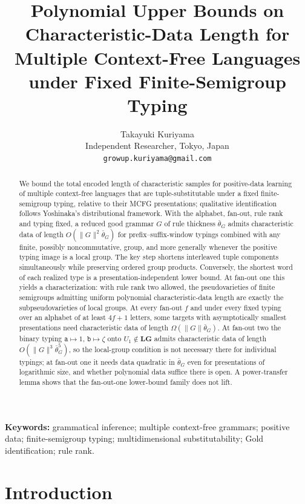 \documentclass[11pt]{article}
\title{Polynomial Upper Bounds on Characteristic-Data Length for Multiple Context-Free Languages under Fixed Finite-Semigroup Typing}
\author{Takayuki Kuriyama\\
Independent Researcher, Tokyo, Japan\\
\texttt{growup.kuriyama@gmail.com}}
\date{}
\numberwithin{equation}{section}
\theoremstyle{plain}
\theoremstyle{definition}
\theoremstyle{remark}
\begin{document}
\maketitle

\begin{abstract}
We bound the total encoded length of characteristic samples for
positive-data learning of multiple context-free languages that are
tuple-substitutable under a fixed finite-semigroup typing, relative to
their MCFG presentations; qualitative identification follows Yoshinaka's
distributional framework.  With the alphabet, fan-out, rule rank and
typing fixed, a reduced good grammar $G$ of rule thickness $\bar\theta_G$
admits characteristic data of length $O(\|G\|^2\bar\theta_G)$ for
prefix--suffix-window typings combined with any finite, possibly
noncommutative, group, and more generally whenever the positive typing image
is a local group.  The key step shortens interleaved tuple components
simultaneously while preserving ordered group products.
Conversely, the shortest word of each realized type is a
presentation-independent lower bound.  At fan-out one this yields a
characterization: with rule rank two allowed, the pseudovarieties of finite
semigroups admitting uniform polynomial characteristic-data length are
exactly the subpseudovarieties of local groups.  At every fan-out $f$ and under
every fixed typing over an alphabet of at least $4f+1$ letters, some targets with
asymptotically smallest presentations need characteristic data of length
$\Omega(\|G\|\bar\theta_G)$.  At fan-out two the
binary typing $\mathtt a\mapsto1$, $\mathtt b\mapsto\zeta$ onto
$U_1\notin\mathbf{LG}$ admits characteristic data of length
$O(\|G\|^3\bar\theta_G^5)$, so the local-group condition is not necessary there
for individual typings; at fan-out one it needs data quadratic in
$\bar\theta_G$ even for presentations of logarithmic size, and whether polynomial
data suffice there is open.  A power-transfer lemma shows that the fan-out-one lower-bound
family does not lift.
\end{abstract}

\medskip
\noindent\textbf{Keywords:} grammatical inference; multiple context-free grammars; positive data; finite-semigroup typing; multidimensional substitutability; Gold identification; rule rank.
\medskip

\section{Introduction}
\label{sec:introduction}
\end{document}
